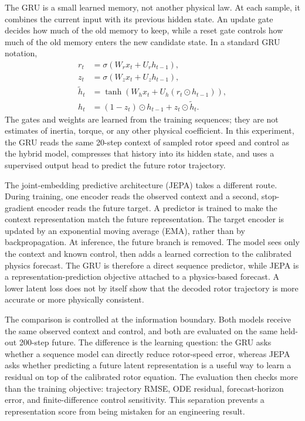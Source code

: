 \documentclass[10pt,journal]{IEEEtran}
\begin{document}
The GRU is a small learned memory, not another physical law. At each sample, it combines the current input with its previous hidden state. An update gate decides how much of the old memory to keep, while a reset gate controls how much of the old memory enters the new candidate state. In a standard GRU notation,
\begin{equation}
 \begin{aligned}
 r_t&=\sigma(W_r x_t+U_r h_{t-1}),\\
 z_t&=\sigma(W_z x_t+U_z h_{t-1}),\\
 \tilde h_t&=\tanh(W_hx_t+U_h(r_t\odot h_{t-1})),\\
 h_t&=(1-z_t)\odot h_{t-1}+z_t\odot\tilde h_t.
 \end{aligned}
\end{equation}
The gates and weights are learned from the training sequences; they are not estimates of inertia, torque, or any other physical coefficient. In this experiment, the GRU reads the same 20-step context of sampled rotor speed and control as the hybrid model, compresses that history into its hidden state, and uses a supervised output head to predict the future rotor trajectory.

The joint-embedding predictive architecture (JEPA) takes a different route. During training, one encoder reads the observed context and a second, stop-gradient encoder reads the future target. A predictor is trained to make the context representation match the future representation. The target encoder is updated by an exponential moving average (EMA), rather than by backpropagation. At inference, the future branch is removed. The model sees only the context and known control, then adds a learned correction to the calibrated physics forecast. The GRU is therefore a direct sequence predictor, while JEPA is a representation-prediction objective attached to a physics-based forecast. A lower latent loss does not by itself show that the decoded rotor trajectory is more accurate or more physically consistent.

The comparison is controlled at the information boundary. Both models receive the same observed context and control, and both are evaluated on the same held-out 200-step future. The difference is the learning question: the GRU asks whether a sequence model can directly reduce rotor-speed error, whereas JEPA asks whether predicting a future latent representation is a useful way to learn a residual on top of the calibrated rotor equation. The evaluation then checks more than the training objective: trajectory RMSE, ODE residual, forecast-horizon error, and finite-difference control sensitivity. This separation prevents a representation score from being mistaken for an engineering result.
\end{document}
